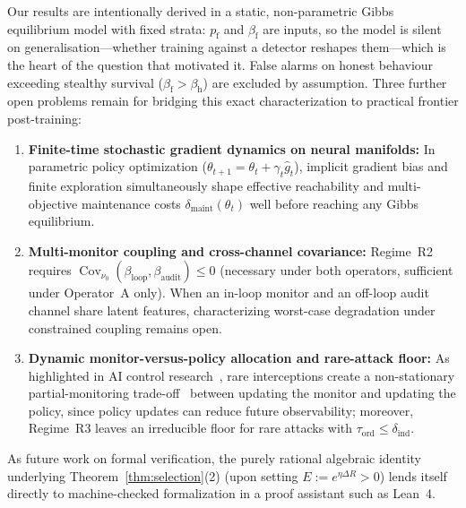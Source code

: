 \documentclass[11pt,a4paper]{article}
\newcommand{\Cov}{\operatorname{Cov}}
\begin{document}
Our results are intentionally derived in a static, non-parametric Gibbs equilibrium model with fixed strata: $p_{\mathrm{f}}$ and $\beta_{\mathrm{f}}$ are inputs, so the model is silent on generalisation---whether training against a detector reshapes them---which is the heart of the question that motivated it. False alarms on honest behaviour exceeding stealthy survival ($\beta_{\mathrm{f}} > \beta_{\mathrm{h}}$) are excluded by assumption. Three further open problems remain for bridging this exact characterization to practical frontier post-training:
\begin{enumerate}
  \item \textbf{Finite-time stochastic gradient dynamics on neural manifolds:} In parametric policy optimization ($\theta_{t+1} = \theta_t + \gamma_t \hat{g}_t$), implicit gradient bias and finite exploration simultaneously shape effective reachability and multi-objective maintenance costs $\delta_{\mathrm{maint}}(\theta_t)$ well before reaching any Gibbs equilibrium.
  \item \textbf{Multi-monitor coupling and cross-channel covariance:} Regime~R2 requires $\Cov_{\nu_0}(\beta_{\mathrm{loop}}, \beta_{\mathrm{audit}}) \le 0$ (necessary under both operators, sufficient under Operator~A only). When an in-loop monitor and an off-loop audit channel share latent features, characterizing worst-case degradation under constrained coupling remains open.
  \item \textbf{Dynamic monitor-versus-policy allocation and rare-attack floor:} As highlighted in AI control research~\cite{ukaisi2025}, rare interceptions create a non-stationary partial-monitoring trade-off~\cite{bartok2014} between updating the monitor and updating the policy, since policy updates can reduce future observability; moreover, Regime~R3 leaves an irreducible floor for rare attacks with $\tau_{\mathrm{ord}} \le \delta_{\mathrm{ind}}$.
\end{enumerate}
As future work on formal verification, the purely rational algebraic identity underlying Theorem~\ref{thm:selection}(2) (upon setting $E := e^{\eta \Delta R} > 0$) lends itself directly to machine-checked formalization in a proof assistant such as Lean~4.
\end{document}
